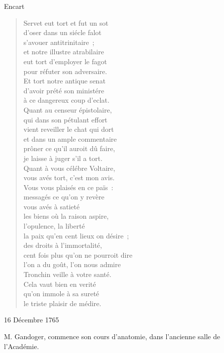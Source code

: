 \begin{diary}{Encart}{}
        
                              \begin{verse}Servet eut tort et fut un
                                    sot\\d'oser dans un siécle falot\\s'avouer antitrinitaire ;\\et notre illustre atrabilaire\\eut tort d'employer le fagot\\pour réfuter son adversaire.\\Et tort notre antique senat\\d'avoir prété son ministére\\à ce dangereux coup d'eclat.\\Quant au censeur épistolaire,\\qui dans son pétulant effort\\vient reveiller le chat qui dort\\et dans un ample commentaire\\prôner ce qu'il auroit dû faire,\\je laisse à juger s'il a tort.\\Quant à vous célébre Voltaire,\\vous avés tort, c'est mon avis.\\Vous vous
                                    plaisés en ce païs :\\messagés ce qu'on y revère\\vous avés à satieté\\les biens où la raison aspire,\\l'opulence, la liberté\\la paix qu'en cent lieux on désire ;\\des droits à l'immortalité,\\cent fois plus qu'on ne pourroit dire\\l'on a du goût, l'on nous admire\\Tronchin veille à votre santé.\\Cela vaut bien en verité\\qu'on immole à sa sureté\\le triste plaisir de médire.\\\end{verse}
        \bigskip
        
        
                           \end{diary}
                     
                     
                     \begin{diary}{16 Décembre 1765}{}
                        
                        
                           M. Gandoger, commence son cours
                           d'anatomie, dans l'ancienne salle
                              de
                              l'Académie. \bigskip
        
        
                     \end{diary}


